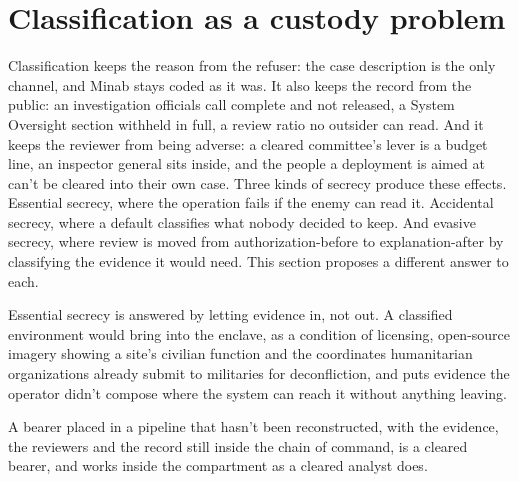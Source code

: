 \section{Classification as a custody problem}
\label{sec:15.5}
Classification keeps the reason from the refuser: the case description is the only channel, and Minab stays coded as it was. It also keeps the record from the public: an investigation officials call complete and not released, a System Oversight section withheld in full, a review ratio no outsider can read. And it keeps the reviewer from being adverse: a cleared committee's lever is a budget line, an inspector general sits inside, and the people a deployment is aimed at can't be cleared into their own case.
Three kinds of secrecy produce these effects. Essential secrecy, where the operation fails if the enemy can read it. Accidental secrecy, where a default classifies what nobody decided to keep. And evasive secrecy, where review is moved from authorization-before to explanation-after by classifying the evidence it would need. This section proposes a different answer to each.

Essential secrecy is answered by letting evidence in, not out. A classified environment would bring into the enclave, as a condition of licensing, open-source imagery showing a site's civilian function and the coordinates humanitarian organizations already submit to militaries for deconfliction, and puts evidence the operator didn't compose where the system can reach it without anything leaving.

A bearer placed in a pipeline that hasn't been reconstructed, with the evidence, the reviewers and the record still inside the chain of command, is a cleared bearer, and works inside the compartment as a cleared analyst does.

